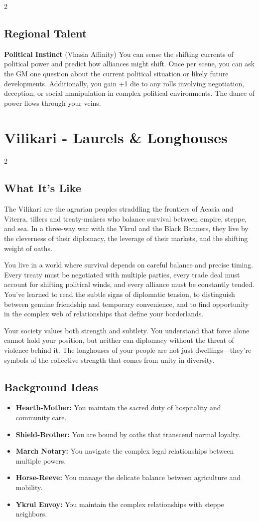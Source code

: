 \documentclass[11pt]{article}
\newcommand{\region}[1]{\section*{#1}}
\newcommand{\subregion}[1]{\subsection*{#1}}
\begin{document}
\begin{multicols}{2}
\subregion{Regional Talent}

\textbf{Political Instinct} (Vhasia Affinity)
You can sense the shifting currents of political power and predict how alliances might shift. Once per scene, you can ask the GM one question about the current political situation or likely future developments. Additionally, you gain +1 die to any rolls involving negotiation, deception, or social manipulation in complex political environments. The dance of power flows through your veins.

\end{multicols}

\region{Vilikari - Laurels \& Longhouses}

\begin{multicols}{2}
\subregion{What It's Like}

The Vilikari are the agrarian peoples straddling the frontiers of Acasia and Viterra, tillers and treaty-makers who balance survival between empire, steppe, and sea. In a three-way war with the Ykrul and the Black Banners, they live by the cleverness of their diplomacy, the leverage of their markets, and the shifting weight of oaths.

You live in a world where survival depends on careful balance and precise timing. Every treaty must be negotiated with multiple parties, every trade deal must account for shifting political winds, and every alliance must be constantly tended. You've learned to read the subtle signs of diplomatic tension, to distinguish between genuine friendship and temporary convenience, and to find opportunity in the complex web of relationships that define your borderlands.

Your society values both strength and subtlety. You understand that force alone cannot hold your position, but neither can diplomacy without the threat of violence behind it. The longhouses of your people are not just dwellings---they're symbols of the collective strength that comes from unity in diversity.

\columnbreak

\subregion{Background Ideas}

\begin{itemize}[leftmargin=*]
    \item \textbf{Hearth-Mother:} You maintain the sacred duty of hospitality and community care.
    \item \textbf{Shield-Brother:} You are bound by oaths that transcend normal loyalty.
    \item \textbf{March Notary:} You navigate the complex legal relationships between multiple powers.
    \item \textbf{Horse-Reeve:} You manage the delicate balance between agriculture and mobility.
    \item \textbf{Ykrul Envoy:} You maintain the complex relationships with steppe neighbors.
\end{itemize}


\end{multicols}
\end{document}
